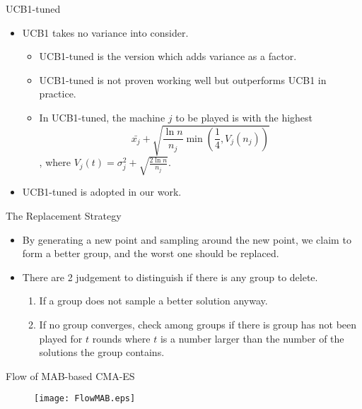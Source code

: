 \begin{frame}{UCB1-tuned}
  \begin{itemize}
    \item UCB1 takes no variance into consider.
      \begin{itemize}
        \item UCB1-tuned is the version which adds variance as a factor.
        \item UCB1-tuned is not proven working well but outperforms UCB1 in
          practice.
        \item In UCB1-tuned, the machine $j$ to be played is with the
          highest \[\bar{x_j} + \sqrt{\frac{\ln{n}}{n_j}
          \min(\frac{1}{4},V_j(n_j))}\], where $V_j(t) =\sigma_j^2 +
          \sqrt{\frac{2\ln n}{n_j}}$.
      \end{itemize}
      \vspace*{14pt}
    \item UCB1-tuned is adopted in our work.
  \end{itemize}

\end{frame}

\begin{frame}{The Replacement Strategy}
  \begin{itemize}
    \item By generating a new point and sampling around the new point,
      we claim to form a better group, and the worst one should be
      replaced.
      \vspace*{14pt}
    \item There are 2 judgement to distinguish if there is any group to
      delete.
      \begin{enumerate}
        \item If a group does not sample a better solution anyway.
        \item If no group converges, check among groups if there is
          group has not been played for $t$ rounds where $t$ is a
          number larger than the number of the solutions the group
          contains.
      \end{enumerate}
  \end{itemize}
\end{frame}

\begin{frame}{Flow of MAB-based CMA-ES}
  \begin{figure}[h]
    \vspace{15mm}\texttt{[image: FlowMAB.eps]}\hspace{25mm}
  \end{figure}
\end{frame}

